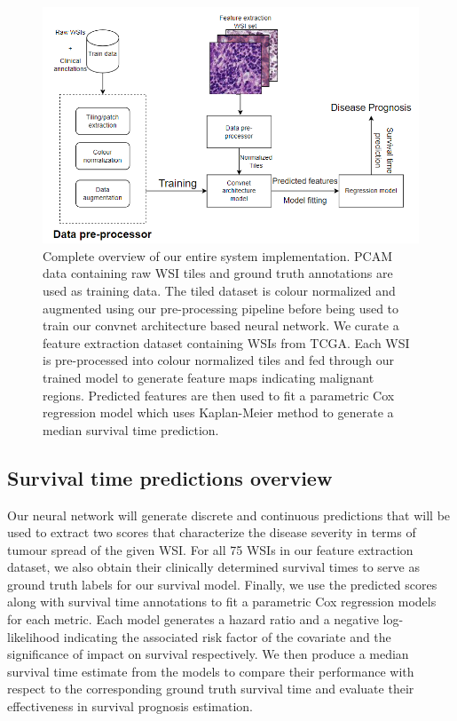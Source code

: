 \documentclass{l4proj}
\begin{document}
\begin{figure}[H]
    \centering
    \includegraphics[scale=0.7]{images/implementation-overview.png}
    \caption{Complete overview of our entire system implementation. PCAM data containing raw WSI tiles and ground truth annotations are used as training data. The tiled dataset is colour normalized and augmented using our pre-processing pipeline before being used to train our convnet architecture based neural network. We curate a feature extraction dataset containing WSIs from TCGA. Each WSI is pre-processed into colour normalized tiles and fed through our trained model to generate feature maps indicating malignant regions. Predicted features are then used to fit a parametric Cox regression model which uses Kaplan-Meier method to generate a median survival time prediction.}
    \label{fig:implementation-overview}
\end{figure}

\subsection{Survival time predictions overview}
Our neural network will generate discrete and continuous predictions that will be used to extract two scores that characterize the disease severity in terms of tumour spread of the given WSI. For all 75 WSIs in our feature extraction dataset, we also obtain their clinically determined survival times to serve as ground truth labels for our survival model. Finally, we use the predicted scores along with survival time annotations to fit a parametric Cox regression models for each metric. Each model generates a hazard ratio and a negative log-likelihood indicating the associated risk factor of the covariate and the significance of impact on survival respectively. We then produce a median survival time estimate from the models to compare their performance with respect to the corresponding ground truth survival time and evaluate their effectiveness in survival prognosis estimation.
\end{document}
